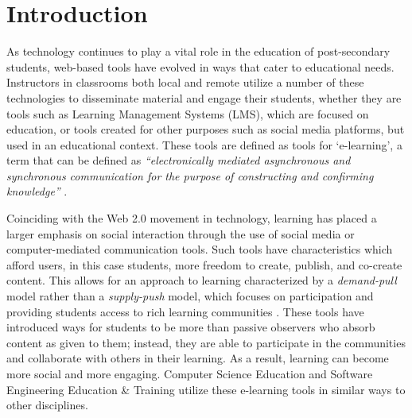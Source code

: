 \chapter{Introduction}



As technology continues to play a vital role in the education of post-secondary students, web-based tools have evolved in ways that cater to educational needs. Instructors in classrooms both local and remote utilize a number of these technologies to disseminate material and engage their students, whether they are tools such as Learning Management Systems (LMS), which are focused on education, or tools created for other purposes such as social media platforms, but used in an educational context. These tools are defined as tools for `e-learning', a term that can be defined as \textit{``electronically mediated asynchronous and synchronous communication for the purpose of constructing and confirming knowledge''} \cite{garrison2011learning}.

Coinciding with the Web 2.0 movement \cite{O'Reilly-What-2005} in technology, learning has placed a larger emphasis on social interaction through the use of social media or computer-mediated communication tools. Such tools have characteristics which afford users, in this case students, more freedom to create, publish, and co-create content. This allows for an approach to learning characterized by a \emph{demand-pull} model rather than a \emph{supply-push} model, which focuses on participation and providing students access to rich learning communities \cite{seely2008open}. These tools have introduced ways for students to be more than passive observers who absorb content as given to them; instead, they are able to participate in the communities and collaborate with others in their learning. As a result, learning can become more social and more engaging. Computer Science Education and Software Engineering Education \& Training utilize these e-learning tools in similar ways to other disciplines.


